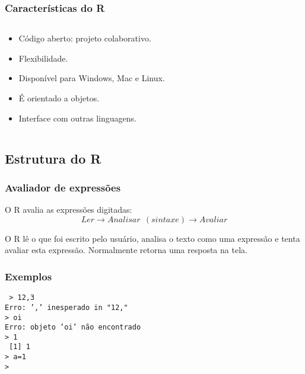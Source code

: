 \documentclass{beamer}
\begin{document}
 \begin{frame}
  \frametitle{Características do R }
  \begin{columns}
    \begin{column}{6cm}
      \begin{center}
        \begin{itemize}
        \item Código aberto: projeto colaborativo.
        \item Flexibilidade.
        \item Disponível para Windows, Mac e Linux.
        \item É orientado a objetos.
        \item Interface com outras linguagens.
        \end{itemize}
      \end{center}
    \end{column}
    \begin{column}{6cm}
    \end{column}
  \end{columns}

 \end{frame}


 \subsection{Estrutura do R}
 \begin{frame}
   \frametitle{Avaliador de expressões}
   \begin{center}
      O R avalia as expressões digitadas:
\pause
      \[ Ler \rightarrow Analisar ~ ~(sintaxe)  \rightarrow Avaliar \]
\pause
     \end{center}
     O R lê o que foi escrito pelo usuário, analisa o texto como uma expressão e tenta avaliar esta expressão. Normalmente retorna uma resposta na tela.
 
 
 \end{frame}
 \begin{frame}
   \frametitle{Exemplos}
          \texttt{
            > 12,3 \\
            Erro: ',' inesperado in "12," \\
\pause
            > oi \\
            Erro: objeto 'oi' não encontrado \\
\pause
             > 1 \\
            ~[1] 1 \\ 
\pause
            > a=1 \\
            >}  
 \end{frame}
\end{document}
